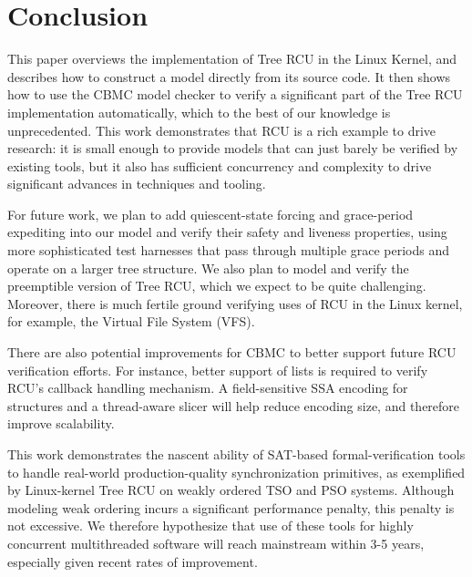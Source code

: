 \section{Conclusion}
This paper overviews the implementation of Tree RCU in the 
Linux Kernel, and describes how to construct a model directly from
its source code. It then shows how to use the CBMC model checker to 
verify a significant part of the Tree RCU implementation automatically, 
which to the best of our knowledge is unprecedented.
%
This work demonstrates that RCU is a rich example to drive research:
it is small enough to provide models that can just
barely be verified by existing tools, but it also has sufficient concurrency
and complexity to drive significant advances in techniques and tooling.

For future work, we plan to 
add quiescent-state forcing and grace-period expediting into our model 
and verify their safety and liveness properties, using more sophisticated 
test harnesses that pass through multiple grace periods and operate on 
a larger tree structure.
%
We also plan to model and verify the preemptible version of Tree RCU, 
which we expect to be quite challenging. Moreover, there is much fertile ground 
verifying uses of RCU in the Linux kernel, for example, the Virtual File
System (VFS).
%

There are also potential improvements for CBMC to better support future
RCU verification efforts. For instance, better support of lists is required
to verify RCU's callback handling mechanism. A field-sensitive SSA encoding
for structures and a thread-aware slicer will help reduce encoding size,
and therefore improve scalability.

This work demonstrates the nascent ability of SAT-based
formal-verification tools to handle real-world pro\-duc\-tion-quality
synchronization primitives, as exemplified by Linux-kernel
Tree RCU on weakly ordered TSO and PSO systems.
Although modeling weak ordering incurs a significant performance
penalty, this penalty is not excessive.
We therefore hypothesize that use of these tools for highly concurrent
multithreaded software
will reach mainstream within 3-5 years, especially given recent
rates of improvement.

